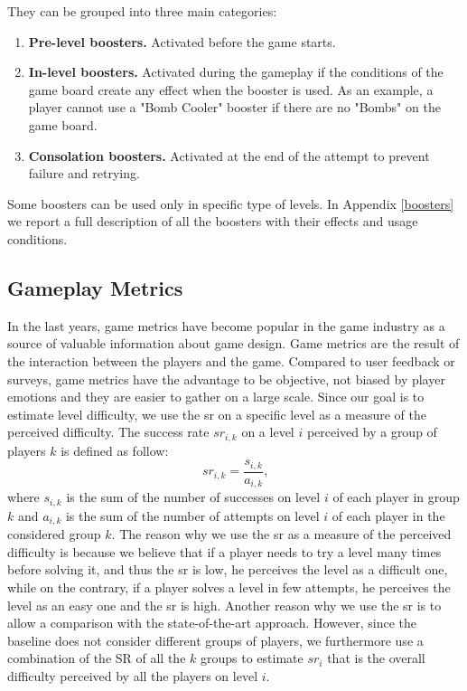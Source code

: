 \noindent
They can be grouped into three main categories:
\begin{enumerate}
    \item \textbf{Pre-level boosters.} Activated before the game starts.
    \item \textbf{In-level boosters.} Activated during the gameplay if the conditions of the game board create any effect when the booster is used. As an example, a player cannot use a "Bomb Cooler" booster if there are no "Bombs" on the game board.
    \item \textbf{Consolation boosters.} Activated at the end of the attempt to prevent failure and retrying.
\end{enumerate}
Some boosters can be used only in specific type of levels. 
In Appendix \ref{boosters} we report a full description of all the boosters with their effects and usage conditions.


\subsection{Gameplay Metrics}
In the last years, game metrics have become popular in the game industry as a source of valuable information about game design. Game metrics are the result of the interaction between the players and the game. Compared to user feedback or surveys, game metrics have the advantage to be objective, not biased by player emotions and they are easier to gather on a large scale. Since our goal is to estimate level difficulty, we use the \acs{sr} on a specific level as a measure of the perceived difficulty. The success rate $sr_{i,k}$ on a level $i$ perceived by a group of players $k$ is defined as follow:
\begin{equation}
 sr_{i,k}= \frac{s_{i,k}}{a_{i,k}} \text{,}
\end{equation}
 \label{eq:sucess_rate}
where $s_{i,k}$ is the sum of the number of successes on level $i$ of each player in group $k$ and $a_{i,k}$ is the sum of the number of attempts on level $i$ of each player in the considered group $k$. The reason why we use the \acs{sr} as a measure of the perceived difficulty is because we believe that if a player needs to try a level many times before solving it, and thus the \acs{sr} is low, he perceives the level as a difficult one, while on the contrary, if a player solves a level in few attempts, he perceives the level as an easy one and the \acs{sr} is high. Another reason why we use the \acs{sr} is to allow a comparison with the state-of-the-art approach. However, since the baseline does not consider different groups of players, we furthermore use a combination of the SR of all the $k$ groups to estimate $sr_{i}$ that is the overall difficulty perceived by all the players on level $i$.

